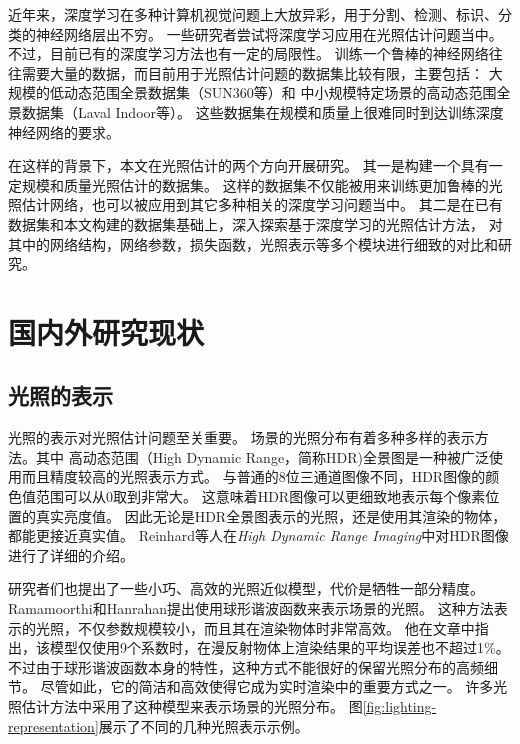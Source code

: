 近年来，深度学习在多种计算机视觉问题上大放异彩，用于分割、检测、标识、分类的神经网络层出不穷。
一些研究者尝试将深度学习应用在光照估计问题当中。
不过，目前已有的深度学习方法也有一定的局限性。
训练一个鲁棒的神经网络往往需要大量的数据，而目前用于光照估计问题的数据集比较有限，主要包括：
大规模的低动态范围全景数据集（SUN360等）和
中小规模特定场景的高动态范围全景数据集（Laval Indoor等）。
这些数据集在规模和质量上很难同时到达训练深度神经网络的要求。

在这样的背景下，本文在光照估计的两个方向开展研究。
其一是构建一个具有一定规模和质量光照估计的数据集。
这样的数据集不仅能被用来训练更加鲁棒的光照估计网络，也可以被应用到其它多种相关的深度学习问题当中。
其二是在已有数据集和本文构建的数据集基础上，深入探索基于深度学习的光照估计方法，
对其中的网络结构，网络参数，损失函数，光照表示等多个模块进行细致的对比和研究。

\section{国内外研究现状}
\subsection{光照的表示}
光照的表示对光照估计问题至关重要。
场景的光照分布有着多种多样的表示方法。其中
高动态范围（High Dynamic Range，简称HDR)全景图是一种被广泛使用而且精度较高的光照表示方式。
与普通的8位三通道图像不同，HDR图像的颜色值范围可以从0取到非常大。
这意味着HDR图像可以更细致地表示每个像素位置的真实亮度值。
因此无论是HDR全景图表示的光照，还是使用其渲染的物体，都能更接近真实值。
Reinhard等人在\textit{High Dynamic Range Imaging}\cite{reinhard2005high}中对HDR图像进行了详细的介绍。

研究者们也提出了一些小巧、高效的光照近似模型，代价是牺牲一部分精度。
Ramamoorthi和Hanrahan\cite{ramamoorthi2001efficient}提出使用球形谐波函数来表示场景的光照。
这种方法表示的光照，不仅参数规模较小，而且其在渲染物体时非常高效。
他在文章中指出，该模型仅使用9个系数时，在漫反射物体上渲染结果的平均误差也不超过1\%。
不过由于球形谐波函数本身的特性，这种方式不能很好的保留光照分布的高频细节。
尽管如此，它的简洁和高效使得它成为实时渲染中的重要方式之一\cite{green2003spherical,sloan2008stupid}。
许多光照估计方法中采用了这种模型来表示场景的光照分布。
图\ref{fig:lighting-representation}展示了不同的几种光照表示示例。


